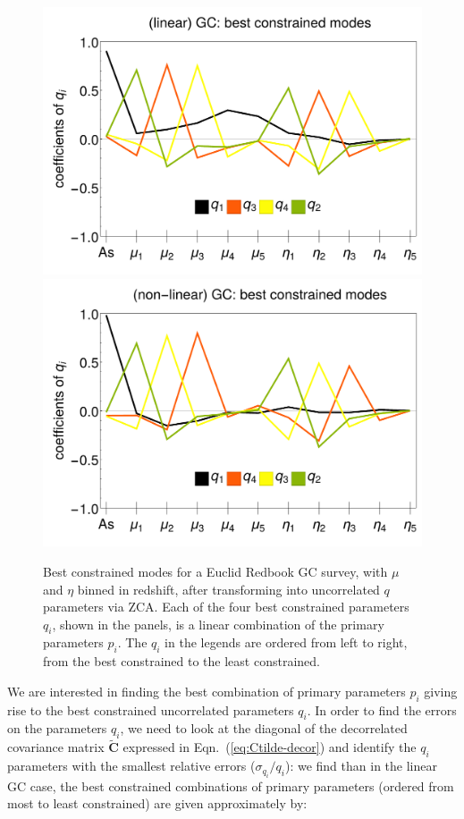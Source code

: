 \begin{figure}[htbp]
	\centering{}\includegraphics[width=0.47\linewidth]{Chapters/linear-nonlinear-MG-forecasts/figures/Decorrelations-GC/linear_GC--_best_constrained_modes-Errors_on_q_ZCA_SquareNorm--_fiducialMGBin3_Euclid_GC_linearPK_}
	\includegraphics[width=0.47\linewidth]{Chapters/linear-nonlinear-MG-forecasts/figures/Decorrelations-GC/non-linear_GC--_best_constrained_modes-Errors_on_q_ZCA_SquareNorm--_fiducialMGBin3_Euclid_GC_nonlinearPk__Zhao_}
	\caption[Best constrained modes for Euclid GC applying ZCA.]{\label{fig:GCbestconst}
Best constrained modes for a Euclid Redbook GC survey, with $\mu$ and $\eta$ binned in redshift, 
after transforming into uncorrelated $q$ parameters via ZCA. 
Each of the four best constrained parameters $q_i$, shown in the panels, 
is a linear combination of the primary parameters $p_i$. The $q_i$ in the legends are ordered from left to right, from the best constrained to the least constrained.}
\end{figure}


We are interested in finding the best combination of primary parameters $p_i$ giving rise
to the best constrained uncorrelated parameters $q_i$. In order to find the errors 
on the parameters $q_i$, we need to look at the diagonal of the decorrelated covariance matrix $\mathbf{\tilde{C}}$ expressed in Eqn.\ (\ref{eq:Ctilde-decor}) and 
identify the $q_i$ parameters with the smallest relative errors ($\sigma_{q_i}/q_i$): we find than in the linear GC case, the best 
constrained combinations of primary parameters (ordered from most to least constrained) are given approximately by:

